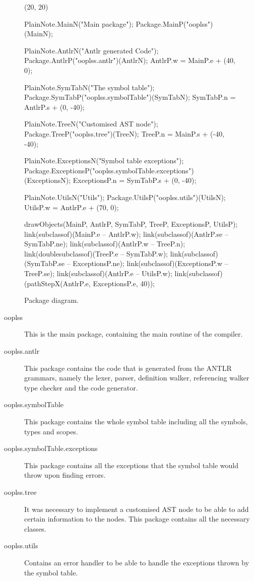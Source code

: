 \begin{figure}[H]
\centering
	\begin{emp}[classdiag](20, 20)

	PlainNote.MainN("Main package");
	Package.MainP("ooplss")(MainN);

	PlainNote.AntlrN("Antlr generated Code");
	Package.AntlrP("ooplss.antlr")(AntlrN);
	AntlrP.w = MainP.e + (40, 0);

	PlainNote.SymTabN("The symbol table");
	Package.SymTabP("ooplss.symbolTable")(SymTabN);
	SymTabP.n = AntlrP.s + (0, -40);

	PlainNote.TreeN("Customised AST node");
	Package.TreeP("ooplss.tree")(TreeN);
	TreeP.n = MainP.s + (-40, -40);

	PlainNote.ExceptionsN("Symbol table exceptions");
	Package.ExceptionsP("ooplss.symbolTable.exceptions")(ExceptionsN);
	ExceptionsP.n = SymTabP.s + (0, -40);

	PlainNote.UtilsN("Utils");
	Package.UtilsP("ooplss.utils")(UtilsN);
	UtilsP.w = AntlrP.e + (70, 0);

	drawObjects(MainP, AntlrP, SymTabP, TreeP, ExceptionsP, UtilsP);
	link(subclassof)(MainP.e -- AntlrP.w);
	link(subclassof)(AntlrP.se -- SymTabP.ne);
	link(subclassof)(AntlrP.w -- TreeP.n);
	link(doublesubclassof)(TreeP.e -- SymTabP.w);
	link(subclassof)(SymTabP.se -- ExceptionsP.ne);
	link(subclassof)(ExceptionsP.w -- TreeP.se);
	link(subclassof)(AntlrP.e -- UtilsP.w);
	link(subclassof)(pathStepX(AntlrP.e, ExceptionsP.e, 40));

	\end{emp}
	\caption{Package diagram.}
	\label{fig:packages}
\end{figure}


\begin{description}
\item[ooplss] This is the main package, containing the main routine of the
compiler.
\item[ooplss.antlr] This package contains the code that is generated from the
ANTLR grammars, namely the lexer, parser, definition walker, referencing walker
type checker and the code generator.
\item[ooplss.symbolTable] This package contains the whole symbol table including
all the symbols, types and scopes.
\item[ooplss.symbolTable.exceptions] This package contains all the exceptions
that the symbol table would throw upon finding errors.
\item[ooplss.tree] It was necessary to implement a customised AST node to be
able to add certain information to the nodes. This package contains all the
necessary classes.
\item[ooplss.utils] Contains an error handler to be able to handle the
exceptions thrown by the symbol table.
\end{description}


